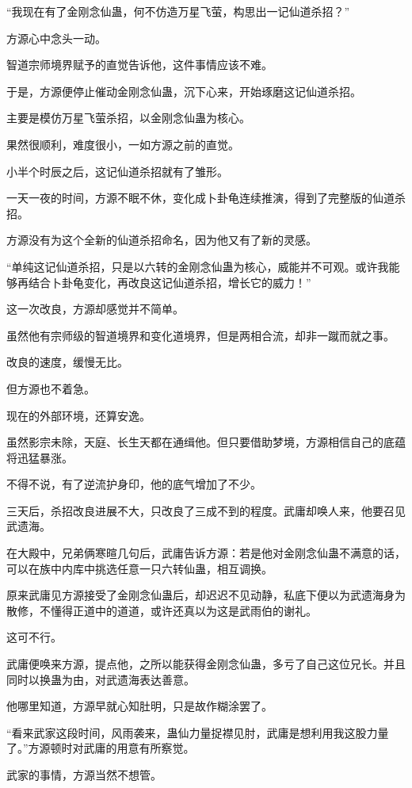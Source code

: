 \begin{this_body}
“我现在有了金刚念仙蛊，何不仿造万星飞萤，构思出一记仙道杀招？”

方源心中念头一动。

智道宗师境界赋予的直觉告诉他，这件事情应该不难。

于是，方源便停止催动金刚念仙蛊，沉下心来，开始琢磨这记仙道杀招。

主要是模仿万星飞萤杀招，以金刚念仙蛊为核心。

果然很顺利，难度很小，一如方源之前的直觉。

小半个时辰之后，这记仙道杀招就有了雏形。

一天一夜的时间，方源不眠不休，变化成卜卦龟连续推演，得到了完整版的仙道杀招。

方源没有为这个全新的仙道杀招命名，因为他又有了新的灵感。

“单纯这记仙道杀招，只是以六转的金刚念仙蛊为核心，威能并不可观。或许我能够再结合卜卦龟变化，再改良这记仙道杀招，增长它的威力！”

这一次改良，方源却感觉并不简单。

虽然他有宗师级的智道境界和变化道境界，但是两相合流，却非一蹴而就之事。

改良的速度，缓慢无比。

但方源也不着急。

现在的外部环境，还算安逸。

虽然影宗未除，天庭、长生天都在通缉他。但只要借助梦境，方源相信自己的底蕴将迅猛暴涨。

不得不说，有了逆流护身印，他的底气增加了不少。

三天后，杀招改良进展不大，只改良了三成不到的程度。武庸却唤人来，他要召见武遗海。

在大殿中，兄弟俩寒暄几句后，武庸告诉方源：若是他对金刚念仙蛊不满意的话，可以在族中内库中挑选任意一只六转仙蛊，相互调换。

原来武庸见方源接受了金刚念仙蛊后，却迟迟不见动静，私底下便以为武遗海身为散修，不懂得正道中的道道，或许还真以为这是武雨伯的谢礼。

这可不行。

武庸便唤来方源，提点他，之所以能获得金刚念仙蛊，多亏了自己这位兄长。并且同时以换蛊为由，对武遗海表达善意。

他哪里知道，方源早就心知肚明，只是故作糊涂罢了。

“看来武家这段时间，风雨袭来，蛊仙力量捉襟见肘，武庸是想利用我这股力量了。”方源顿时对武庸的用意有所察觉。

武家的事情，方源当然不想管。


\end{this_body}
